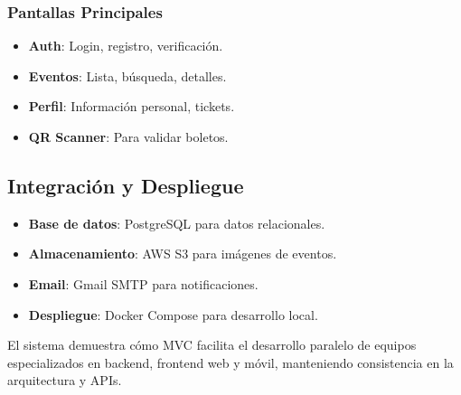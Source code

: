 \subsubsection{Pantallas Principales}
\begin{itemize}
\item \textbf{Auth}: Login, registro, verificación.
\item \textbf{Eventos}: Lista, búsqueda, detalles.
\item \textbf{Perfil}: Información personal, tickets.
\item \textbf{QR Scanner}: Para validar boletos.
\end{itemize}

\subsection{Integración y Despliegue}
\begin{itemize}
\item \textbf{Base de datos}: PostgreSQL para datos relacionales.
\item \textbf{Almacenamiento}: AWS S3 para imágenes de eventos.
\item \textbf{Email}: Gmail SMTP para notificaciones.
\item \textbf{Despliegue}: Docker Compose para desarrollo local.
\end{itemize}

El sistema demuestra cómo MVC facilita el desarrollo paralelo de equipos especializados en backend, frontend web y móvil, manteniendo consistencia en la arquitectura y APIs.